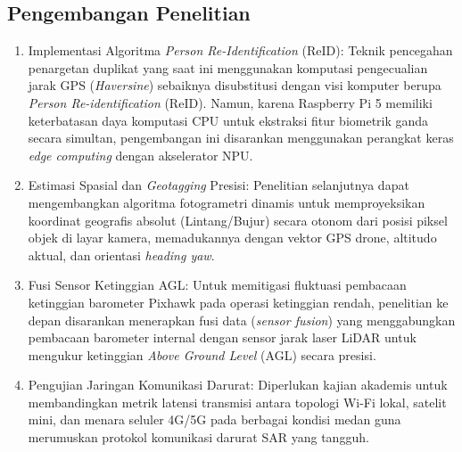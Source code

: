 \subsection{Pengembangan Penelitian}
\begin{enumerate}
	\item Implementasi Algoritma \textit{Person Re-Identification} (ReID): Teknik pencegahan penargetan duplikat yang saat ini menggunakan komputasi pengecualian jarak GPS (\textit{Haversine}) sebaiknya disubstitusi dengan visi komputer berupa \textit{Person Re-identification} (ReID). Namun, karena Raspberry Pi 5 memiliki keterbatasan daya komputasi CPU untuk ekstraksi fitur biometrik ganda secara simultan, pengembangan ini disarankan menggunakan perangkat keras \textit{edge computing} dengan akselerator NPU.
	\item Estimasi Spasial dan \textit{Geotagging} Presisi: Penelitian selanjutnya dapat mengembangkan algoritma fotogrametri dinamis untuk memproyeksikan koordinat geografis absolut (Lintang/Bujur) secara otonom dari posisi piksel objek di layar kamera, memadukannya dengan vektor GPS drone, altitudo aktual, dan orientasi \textit{heading yaw}.
	\item Fusi Sensor Ketinggian AGL: Untuk memitigasi fluktuasi pembacaan ketinggian barometer Pixhawk pada operasi ketinggian rendah, penelitian ke depan disarankan menerapkan fusi data (\textit{sensor fusion}) yang menggabungkan pembacaan barometer internal dengan sensor jarak laser LiDAR untuk mengukur ketinggian \textit{Above Ground Level} (AGL) secara presisi.
	\item Pengujian Jaringan Komunikasi Darurat: Diperlukan kajian akademis untuk membandingkan metrik latensi transmisi antara topologi Wi-Fi lokal, satelit mini, dan menara seluler 4G/5G pada berbagai kondisi medan guna merumuskan protokol komunikasi darurat SAR yang tangguh.
\end{enumerate}
